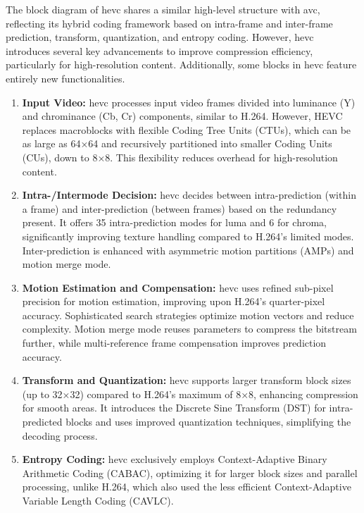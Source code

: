 \documentclass{ioereport}
\begin{document}
    The block diagram of \gls{hevc} shares a similar high-level structure with \gls{avc}, reflecting its hybrid coding framework based on intra-frame and inter-frame prediction, transform, quantization, and entropy coding. However, \gls{hevc} introduces several key advancements to improve compression efficiency, particularly for high-resolution content. Additionally, some blocks in \gls{hevc} feature entirely new functionalities.

    \begin{enumerate}[label=\textbf{\roman*.}]
        \item \textbf{Input Video:}  
        \gls{hevc} processes input video frames divided into luminance (Y) and chrominance (Cb, Cr) components, similar to H.264. However, HEVC replaces macroblocks with flexible Coding Tree Units (CTUs), which can be as large as 64×64 and recursively partitioned into smaller Coding Units (CUs), down to 8×8. This flexibility reduces overhead for high-resolution content.
    
        \item \textbf{Intra-/Intermode Decision:}  
        \gls{hevc} decides between intra-prediction (within a frame) and inter-prediction (between frames) based on the redundancy present. It offers 35 intra-prediction modes for luma and 6 for chroma, significantly improving texture handling compared to H.264's limited modes. Inter-prediction is enhanced with asymmetric motion partitions (AMPs) and motion merge mode.
    
        \item \textbf{Motion Estimation and Compensation:}  
        \gls{hevc} uses refined sub-pixel precision for motion estimation, improving upon H.264's quarter-pixel accuracy. Sophisticated search strategies optimize motion vectors and reduce complexity. Motion merge mode reuses parameters to compress the bitstream further, while multi-reference frame compensation improves prediction accuracy.
    
        \item \textbf{Transform and Quantization:}  
        \gls{hevc} supports larger transform block sizes (up to 32×32) compared to H.264's maximum of 8×8, enhancing compression for smooth areas. It introduces the Discrete Sine Transform (DST) for intra-predicted blocks and uses improved quantization techniques, simplifying the decoding process.
    
        \item \textbf{Entropy Coding:}  
        \gls{hevc} exclusively employs Context-Adaptive Binary Arithmetic Coding (CABAC), optimizing it for larger block sizes and parallel processing, unlike H.264, which also used the less efficient Context-Adaptive Variable Length Coding (CAVLC).
    

\end{enumerate}
\end{document}
